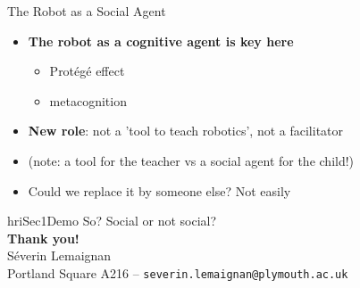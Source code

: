 \documentclass[compress]{beamer}
\begin{document}
{
\begin{frame}{The Robot as a Social Agent}
    \begin{itemize}
        \item<+-> {\bf The robot as a cognitive agent is key here}
            \begin{itemize}
                \item Protégé effect
                \item metacognition
            \end{itemize}
        \item<+-> \textbf{New role}: not a 'tool to teach robotics', not a facilitator
        \item<+-> (note: a tool for the teacher vs a social agent for the child!)
        \item<+-> Could we replace it by someone else? Not easily
    \end{itemize}

\end{frame}
}






{
\begin{frame}[plain]

    \vspace{8cm}

\begin{beamercolorbox}[wd=\linewidth,ht=6ex,dp=0.7ex]{hriSec1Demo}
        \Large
        So? Social or not social?\\[2em]
        \normalsize
    \textbf{Thank you!}\\
    \scriptsize
    Séverin Lemaignan\\
    Portland Square A216 -- {\tt severin.lemaignan@plymouth.ac.uk}
\end{beamercolorbox}
    \vfill
\end{frame}
}
\end{document}
